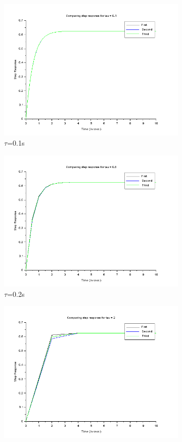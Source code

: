 \documentclass[12pt]{article}
\begin{document}
    \begin{figure}[H]
        \begin{subfigure}{.5\textwidth}
            \centering
            \includegraphics[width=.8\linewidth]{q5_1st_value.png}  
            \caption{$\tau$=0.1s}
            \label{fig:sub-first}
        \end{subfigure}
        \hfill
        \begin{subfigure}{.5\textwidth}
            \centering
            \includegraphics[width=.8\linewidth]{q5_2nd_value.png}  
            \caption{$\tau$=0.2s}
            \label{fig:sub-second}
        \end{subfigure}
        \newline
        \begin{subfigure}{\textwidth}
            \centering
            \includegraphics[width=.8\linewidth]{q5_2.png}  

\end{subfigure}
\end{figure}
\end{document}
